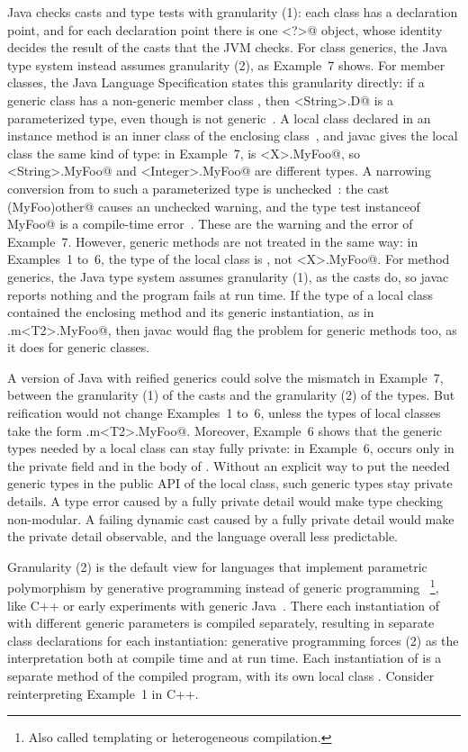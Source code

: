 Java checks casts and type tests with granularity (1):
each class has a declaration point, and for each declaration point there is one \Q@Class<?>@ object, whose identity decides the result of the casts that the JVM checks.
For class generics, the Java type system instead assumes granularity (2), as Example~7 shows.
For member classes, the Java Language Specification states this granularity directly:
if a generic class \Q@C@ has a non-generic member class \Q@D@, then \Q@C<String>.D@ is a parameterized type, even though \Q@D@ is not generic~\cite[\S 4.5]{jls}.
A local class declared in an instance method is an inner class of the enclosing class~\cite[\S 8.1.3]{jls}, and javac gives the local class the same kind of type:
in Example~7, \Q@MyFoo@ is \Q@Box<X>.MyFoo@, so \Q@Box<String>.MyFoo@ and \Q@Box<Integer>.MyFoo@ are different types.
A narrowing conversion from \Q@Object@ to such a parameterized type is unchecked~\cite[\S 5.1.6.2]{jls}:
the cast \Q@(MyFoo)other@ causes an unchecked warning, and the type test \Q@other instanceof MyFoo@ is a compile-time error~\cite[\S 15.20.2]{jls}.
These are the warning and the error of Example~7.
However, generic methods are not treated in the same way:
in Examples~1 to~6, the type of the local class is \Q@MyFoo@, not \Q@m<X>.MyFoo@.
For method generics, the Java type system assumes granularity (1), as the casts do, so javac reports nothing and the program fails at run time.
If the type of a local class contained the enclosing method and its generic instantiation, as in .m<T2>.MyFoo@,
then javac would flag the problem for generic methods too, as it does for generic classes.

A version of Java with reified generics could solve the mismatch in Example~7, between the granularity (1) of the casts and the granularity (2) of the types.
But reification would not change Examples~1 to~6, unless the types of local classes take the form .m<T2>.MyFoo@.
Moreover, Example~6 shows that the generic types needed by a local class can stay fully private:
in Example~6, \Q@X@ occurs only in the private field \Q@v@ and in the body of \Q@show@.
Without an explicit way to put the needed generic types in the public API of the local class, such generic types stay private details.
A type error caused by a fully private detail would make type checking non-modular.
A failing dynamic cast caused by a fully private detail would make the private detail observable, and the language overall less predictable.

Granularity (2) is the default view for languages that implement parametric polymorphism by generative programming instead of generic programming~%
\footnote{Also called templating or heterogeneous compilation.},
like C++ or early experiments with generic Java~\cite{agesen1997adding}.
There each instantiation of \Q@m@ with different generic parameters is compiled separately, resulting in separate class declarations for each instantiation:
generative programming forces (2) as the interpretation both at compile time and at run time.
Each instantiation of \Q@m@ is a separate method of the compiled program, with its own local class \Q@MyFoo@.
Consider reinterpreting Example~1 in C++.

